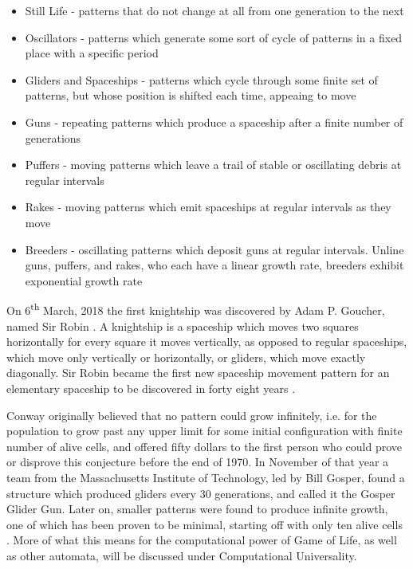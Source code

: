 \documentclass[11pt,a4paper]{article}
\begin{document}
    \begin{itemize}
        \item Still Life - patterns that do not change at all from one
            generation to the next
        \item Oscillators - patterns which generate some sort of cycle of
            patterns in a fixed place with a specific period
        \item Gliders and Spaceships - patterns which cycle through some finite
            set of patterns, but whose position is shifted each time, appeaing
            to move
        \item Guns - repeating patterns which produce a spaceship after a finite
            number of generations
        \item Puffers - moving patterns which leave a trail of stable or
            oscillating debris at regular intervals
        \item Rakes - moving patterns which emit spaceships at regular intervals
            as they move
        \item Breeders - oscillating patterns which deposit guns at regular
            intervals. Unline guns, puffers, and rakes, who each have a linear
            growth rate, breeders exhibit exponential growth rate
    \end{itemize}

    On 6\textsuperscript{th} March, 2018 the first knightship was discovered by
    Adam P. Goucher, named Sir Robin \cite{Knightship}. A knightship is a
    spaceship which moves two squares horizontally for every square it moves
    vertically, as opposed to regular spaceships, which move only vertically or
    horizontally, or gliders, which move exactly diagonally. Sir Robin became
    the first new spaceship movement pattern for an elementary spaceship to be
    discovered in forty eight years \cite{fortyeight}.

    Conway originally believed that no pattern could grow infinitely, i.e. for
    the population to grow past any upper limit for some initial configuration
    with finite number of alive cells, and offered fifty dollars to the first
    person who could prove or disprove this conjecture before the end of 1970.
    In November of that year a team from the Massachusetts Institute of
    Technology, led by Bill Gosper, found a structure which produced gliders
    every 30 generations, and called it the Gosper Glider Gun. Later on, smaller
    patterns were found to produce infinite growth, one of which has been proven
    to be minimal, starting off with only ten alive cells
    \cite{infiniteGrowth}. More of what this means for the computational power
    of Game of Life, as well as other automata, will be discussed under
    Computational Universality.
\end{document}
